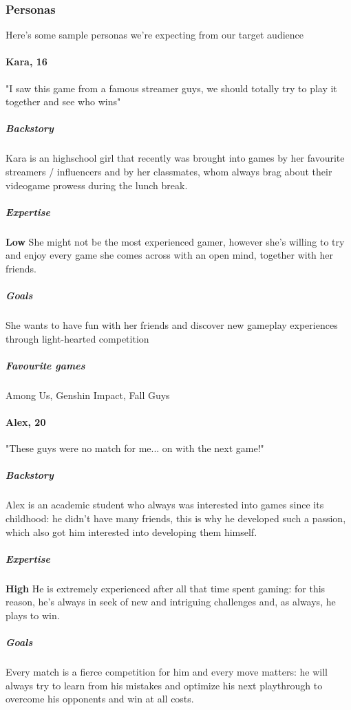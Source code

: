 \subsubsection{Personas}
Here's some sample personas we're expecting from our target audience 

\paragraph{Kara, 16}


"I saw this game from a famous streamer guys, we should totally try to play it together and see who wins"

\subparagraph{Backstory}
Kara is an highschool girl that recently was brought into games by her favourite streamers / influencers and by her classmates, whom always brag about their videogame prowess during the lunch break.

\subparagraph{Expertise}
\textbf{Low} She might not be the most experienced gamer, however she's willing to try and enjoy every game she comes across with an open mind, together with her friends.

\subparagraph{Goals}
She wants to have fun with her friends and discover new gameplay experiences through light-hearted competition

\subparagraph{Favourite games}
Among Us, Genshin Impact, Fall Guys

\paragraph{Alex, 20} 


"These guys were no match for me... on with the next game!"

\subparagraph{Backstory}
Alex is an academic student who always was interested into games since its childhood: he didn't have many friends, this is why he developed such a passion, which also got him interested into developing them himself.

\subparagraph{Expertise}
\textbf{High} He is extremely experienced after all that time spent gaming: for this reason, he's always in seek of new and intriguing challenges and, as always, he plays to win.

\subparagraph{Goals}
Every match is a fierce competition for him and every move matters: he will always try to learn from his mistakes and optimize his next playthrough to overcome his opponents and win at all costs.

